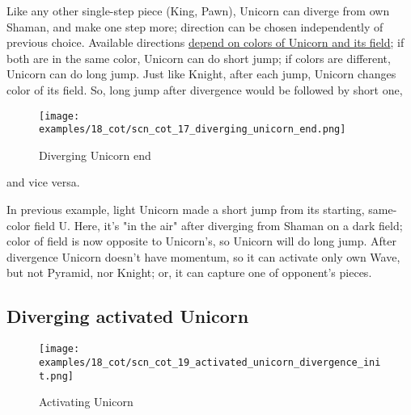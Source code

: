\vspace*{-0.5\baselineskip}
Like any other single-step piece (King, Pawn), Unicorn can diverge from own Shaman,
and make one step more; direction can be chosen independently of previous choice.
Available directions
\hyperref[fig:scn_aoa_01_unicorn_same_color]{depend on colors of Unicorn and its field};
if both are in the same color, Unicorn can do short jump; if colors are different, Unicorn
can do long jump. Just like Knight, after each jump, Unicorn changes color of its field.
So, long jump after divergence would be followed by short one,

\clearpage %

\vspace*{-2.1\baselineskip}
\noindent
\begin{figure}[!h]
\texttt{[image: examples/18\_cot/scn\_cot\_17\_diverging\_unicorn\_end.png]}
\vspace*{-1.3\baselineskip}
\caption{Diverging Unicorn end}
\label{fig:scn_cot_17_diverging_unicorn_end}
\end{figure}

\vspace*{-0.4\baselineskip}
\noindent
and vice versa.

In previous example, light Unicorn made a short jump from its starting, same-color
field U. Here, it's "in the air" after diverging from Shaman on a dark field; color
of field is now opposite to Unicorn's, so Unicorn will do long jump.
After divergence Unicorn doesn't have momentum, so it can activate only own Wave,
but not Pyramid, nor Knight; or, it can capture one of opponent's pieces.

\clearpage %

\subsection*{Diverging activated Unicorn}
\label{sec:Conquest of Tlalocan/Divergence/Diverging activated Unicorn}

\vspace*{-1.4\baselineskip}
\noindent
\begin{figure}[!h]
\texttt{[image: examples/18\_cot/scn\_cot\_19\_activated\_unicorn\_divergence\_init.png]}
\vspace*{-1.3\baselineskip}
\caption{Activating Unicorn}
\label{fig:scn_cot_19_activated_unicorn_divergence_init}
\end{figure}

